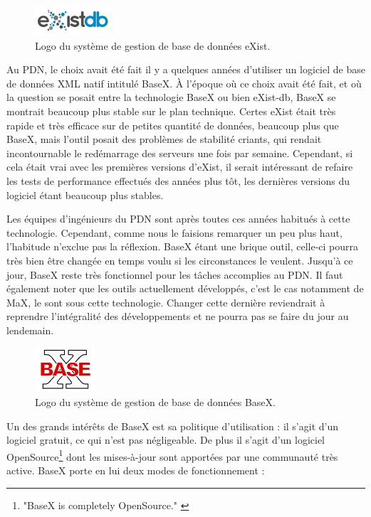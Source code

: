 \documentclass[a4paper,12pt,twoside]{book}
\begin{document}
    \begin{figure}
    \centering
    \includegraphics[width=0.25\textwidth]{img/partie_1/existdb.jpg}
    \caption{Logo du système de gestion de base de données eXist.}
\end{figure}
    
    
    Au \acrshort{PDN}, le choix avait été fait il y a quelques années d'utiliser un logiciel de base de données \acrshort{XML} natif intitulé BaseX. À l'époque où ce choix avait été fait, et où la question se posait entre la technologie BaseX ou bien eXist-db, BaseX se montrait beaucoup plus stable sur le plan technique. Certes eXist était très rapide et très efficace sur de petites quantité de données, beaucoup plus que BaseX, mais l'outil posait des problèmes de stabilité criants, qui rendait incontournable le redémarrage des serveurs une fois par semaine. Cependant, si cela était vrai avec les premières versions d'eXist, il serait intéressant de refaire les tests de performance effectués des années plus tôt, les dernières versions du logiciel étant beaucoup plus stables. 
    
    Les équipes d'ingénieurs du \acrshort{PDN} sont après toutes ces années habitués à cette technologie. Cependant, comme nous le faisions remarquer un peu plus haut, l'habitude n'exclue pas la réflexion. BaseX étant une brique outil, celle-ci pourra très bien être changée en temps voulu si les circonstances le veulent. Jusqu'à ce jour, BaseX reste très fonctionnel pour les tâches accomplies au \acrshort{PDN}. Il faut également noter que les outils actuellement développés, c'est le cas notamment de MaX, le sont sous cette technologie. Changer cette dernière reviendrait à reprendre l'intégralité des développements et ne pourra pas se faire du jour au lendemain.
    
     \begin{figure}
    \centering
    \includegraphics[width=0.20\textwidth]{img/partie_1/baseX.png}
    \caption{Logo du système de gestion de base de données BaseX.}
\end{figure}
         Un des grands intérêts de BaseX est sa politique d'utilisation : il s'agit d'un logiciel gratuit, ce qui n'est pas négligeable. De plus il s'agit d'un logiciel OpenSource\footnote{"BaseX is completely OpenSource." \cite{map_xml}} dont les mises-à-jour sont apportées par une communauté très active. BaseX porte en lui deux modes de fonctionnement :
         
\end{document}
